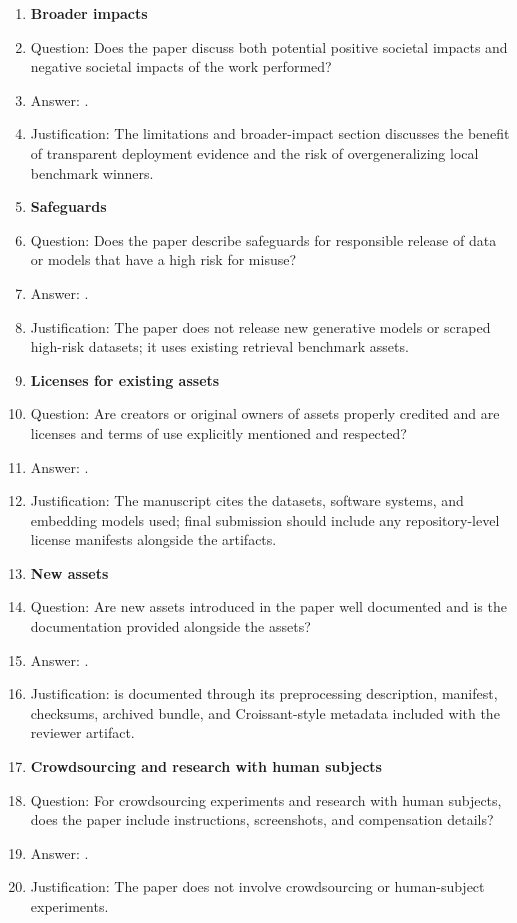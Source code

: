 \begin{enumerate}
\item {\bf Broader impacts}
    \item[] Question: Does the paper discuss both potential positive societal impacts and negative societal impacts of the work performed?
    \item[] Answer: \answerYes{}.
    \item[] Justification: The limitations and broader-impact section discusses the benefit of transparent deployment evidence and the risk of overgeneralizing local benchmark winners.

\item {\bf Safeguards}
    \item[] Question: Does the paper describe safeguards for responsible release of data or models that have a high risk for misuse?
    \item[] Answer: \answerNA{}.
    \item[] Justification: The paper does not release new generative models or scraped high-risk datasets; it uses existing retrieval benchmark assets.

\item {\bf Licenses for existing assets}
    \item[] Question: Are creators or original owners of assets properly credited and are licenses and terms of use explicitly mentioned and respected?
    \item[] Answer: \answerYes{}.
    \item[] Justification: The manuscript cites the datasets, software systems, and embedding models used; final submission should include any repository-level license manifests alongside the artifacts.

\item {\bf New assets}
    \item[] Question: Are new assets introduced in the paper well documented and is the documentation provided alongside the assets?
    \item[] Answer: \answerYes{}.
    \item[] Justification: \hotpotmaxionbench{} is documented through its preprocessing description, manifest, checksums, archived bundle, and Croissant-style metadata included with the reviewer artifact.

\item {\bf Crowdsourcing and research with human subjects}
    \item[] Question: For crowdsourcing experiments and research with human subjects, does the paper include instructions, screenshots, and compensation details?
    \item[] Answer: \answerNA{}.
    \item[] Justification: The paper does not involve crowdsourcing or human-subject experiments.


\end{enumerate}
